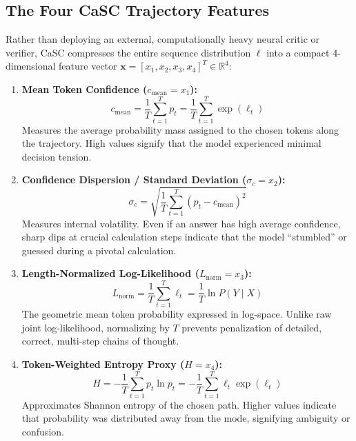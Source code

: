 \documentclass[11pt,a4paper]{article}
\begin{document}
\subsection{The Four CaSC Trajectory Features}
Rather than deploying an external, computationally heavy neural critic or verifier, CaSC compresses the entire sequence distribution $\boldsymbol{\ell}$ into a compact 4-dimensional feature vector $\mathbf{x} = [x_1, x_2, x_3, x_4]^T \in \mathbb{R}^4$:

\begin{enumerate}[leftmargin=*]
    \item \textbf{Mean Token Confidence ($c_{\text{mean}} = x_1$):}
    \begin{equation}
        c_{\text{mean}} = \frac{1}{T} \sum_{t=1}^{T} p_t = \frac{1}{T} \sum_{t=1}^{T} \exp(\ell_t)
    \end{equation}
    Measures the average probability mass assigned to the chosen tokens along the trajectory. High values signify that the model experienced minimal decision tension.

    \item \textbf{Confidence Dispersion / Standard Deviation ($\sigma_c = x_2$):}
    \begin{equation}
        \sigma_c = \sqrt{\frac{1}{T} \sum_{t=1}^{T} (p_t - c_{\text{mean}})^2}
    \end{equation}
    Measures internal volatility. Even if an answer has high average confidence, sharp dips at crucial calculation steps indicate that the model ``stumbled'' or guessed during a pivotal calculation.

    \item \textbf{Length-Normalized Log-Likelihood ($L_{\text{norm}} = x_3$):}
    \begin{equation}
        L_{\text{norm}} = \frac{1}{T} \sum_{t=1}^{T} \ell_t = \frac{1}{T} \ln P(Y \mid X)
    \end{equation}
    The geometric mean token probability expressed in log-space. Unlike raw joint log-likelihood, normalizing by $T$ prevents penalization of detailed, correct, multi-step chains of thought.

    \item \textbf{Token-Weighted Entropy Proxy ($H = x_4$):}
    \begin{equation}
        H = - \frac{1}{T} \sum_{t=1}^{T} p_t \ln p_t = - \frac{1}{T} \sum_{t=1}^{T} \ell_t \exp(\ell_t)
    \end{equation}
    Approximates Shannon entropy of the chosen path. Higher values indicate that probability was distributed away from the mode, signifying ambiguity or confusion.
\end{enumerate}
\end{document}
